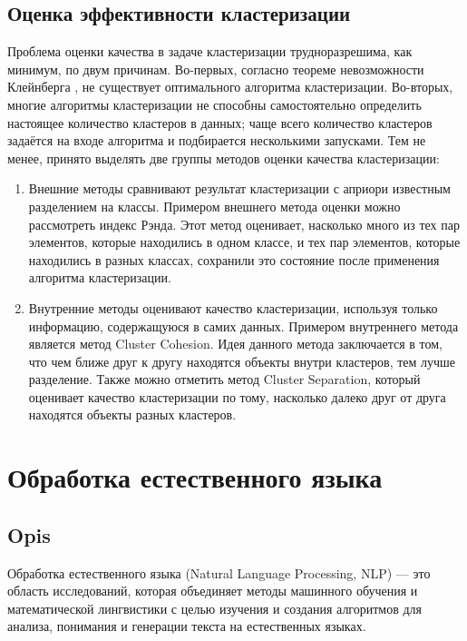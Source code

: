 	\subsection{Оценка эффективности кластеризации}
		Проблема оценки качества в задаче кластеризации трудноразрешима, как минимум, по двум причинам. Во-первых, согласно теореме невозможности Клейнберга \cite{Kleinberg}, не существует оптимального алгоритма кластеризации. Во-вторых, многие алгоритмы кластеризации не способны самостоятельно определить настоящее количество кластеров в данных; чаще всего количество кластеров задаётся на входе алгоритма и подбирается несколькими запусками.
		Тем не менее, принято выделять две группы методов оценки качества кластеризации:
		\begin{enumerate}
			\item Внешние методы сравнивают результат кластеризации с априори известным разделением на классы. Примером внешнего метода оценки можно рассмотреть индекс Рэнда. Этот метод оценивает, насколько много из тех пар элементов, которые находились в одном классе, и тех пар элементов, которые находились в разных классах, сохранили это состояние после применения алгоритма кластеризации.
			\item Внутренние методы оценивают качество кластеризации, используя только информацию, содержащуюся в самих данных. Примером внутреннего метода является метод Cluster Cohesion. Идея данного метода заключается в том, что чем ближе друг к другу находятся объекты внутри кластеров, тем лучше разделение. Также можно отметить метод Cluster Separation, который оценивает качество кластеризации по тому, насколько далеко друг от друга находятся объекты разных кластеров.
		\end{enumerate}


\section{Обработка естественного языка}

	\subsection{Opis}
		Обработка естественного языка (Natural Language Processing, NLP) — это область исследований, которая объединяет методы машинного обучения и математической лингвистики с целью изучения и создания алгоритмов для анализа, понимания и генерации текста на естественных языках. \cite{NLP}


